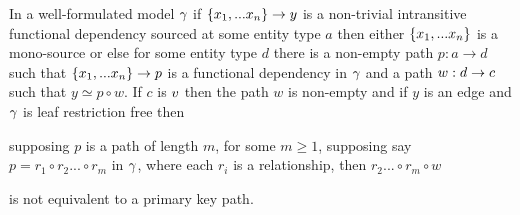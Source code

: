 \begin{lemma}
In a well-formulated model $\gamma$  if $\left\{x_1,...x_n\right\} \rightarrow y$  is a non-trivial intransitive 
functional dependency sourced at some entity type $a$ then either $\left\{x_1,...x_n\right\}$ is a mono-source
or else for some entity type $d$ there is a non-empty  path $p:a \rightarrow d$ such that $\{x_1,...x_n\} \rightarrow p$ is a functional dependency in $\gamma$
and a  path $w:d \rightarrow c$  such that $y \simeq p \circ w$. If $c$ is $v$ then
the path $w$ is non-empty and if $y$ is an edge and $\gamma$ is leaf restriction free then
\begin{newtt} supposing $p$ is a path of length $m$, for some $m \geq 1$, supposing say $ p = r_1 \circ r_2 ... \circ r_m$ 
 in $\gamma$,   where each $r_i$ is a relationship, then $r_2 ... \circ r_m \circ w$
\end{newtt}
is not equivalent to a primary key path.
\end{lemma}
